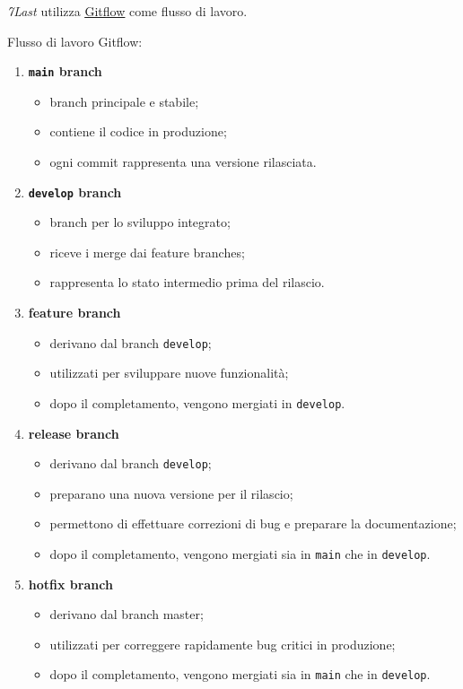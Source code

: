 \textit{7Last} utilizza \href{https://www.atlassian.com/it/git/tutorials/comparing-workflows/gitflow-workflow}{\underline{{Gitflow}}} come flusso di lavoro.
\begin{flushleft}
	Flusso di lavoro Gitflow:
\end{flushleft}
\begin{enumerate}
    \item \textbf{\texttt{main} branch}
    \begin{itemize}
        \item branch principale e stabile;
        \item contiene il codice in produzione;
        \item ogni commit rappresenta una versione rilasciata.
    \end{itemize}

    \item \textbf{\texttt{develop} branch}
    \begin{itemize}
        \item branch per lo sviluppo integrato;
        \item riceve i merge dai feature branches;
        \item rappresenta lo stato intermedio prima del rilascio.
    \end{itemize}

    \item \textbf{feature branch}
    \begin{itemize}
        \item derivano dal branch \texttt{develop};
        \item utilizzati per sviluppare nuove funzionalità;
        \item dopo il completamento, vengono mergiati in \texttt{develop}.
    \end{itemize}

    \item \textbf{release branch}
    \begin{itemize}
        \item derivano dal branch \texttt{develop};
        \item preparano una nuova versione per il rilascio;
        \item permettono di effettuare correzioni di bug e preparare la documentazione;
        \item dopo il completamento, vengono mergiati sia in \texttt{main} che in \texttt{develop}.
    \end{itemize}

    \item \textbf{hotfix branch}
    \begin{itemize}
        \item derivano dal branch master;
        \item utilizzati per correggere rapidamente bug critici in produzione;
        \item dopo il completamento, vengono mergiati sia in \texttt{main} che in \texttt{develop}.
    \end{itemize}
\end{enumerate}

